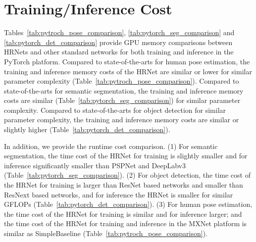 \documentclass[10pt,journal,compsoc]{IEEEtran}
\begin{document}
\clearpage
\onecolumn
\section{Training/Inference Cost}
Tables~\ref{tab:pytroch_pose_comparison}, \ref{tab:pytorch_seg_comparison} and \ref{tab:pytorch_det_comparison} provide GPU memory comparisons between HRNets and other standard networks
for both training and inference
in the PyTorch platform.
Compared to state-of-the-arts for human pose estimation,
the training and inference memory costs of the HRNet are similar or lower
for similar parameter complexity (Table~\ref{tab:pytroch_pose_comparison}).
Compared to state-of-the-arts for semantic segmentation,
the training and inference memory costs are similar 
(Table~\ref{tab:pytorch_seg_comparison})
for similar parameter complexity.
Compared to state-of-the-arts for object detection for similar parameter complexity,
the training and inference memory costs 
are similar or slightly higher
(Table~\ref{tab:pytorch_det_comparison}).

In addition,
we provide the runtime cost comparison.
(1) For semantic segmentation,
the time cost of the HRNet for training is slightly smaller
and for inference significantly smaller
than PSPNet and DeepLabv3 (Table~\ref{tab:pytorch_seg_comparison}).
(2) For object detection,
the time cost of the HRNet for training is larger than ResNet based networks and smaller than ResNext based networks, and for inference the HRNet 
is smaller for similar GFLOPs
(Table~\ref{tab:pytorch_det_comparison}).
(3) For human pose estimation,
the time cost of the HRNet for training 
is similar
and for inference
larger;
and the time cost of the HRNet for training and inference
in the MXNet platform 
is similar as SimpleBaseline (Table~\ref{tab:pytroch_pose_comparison}).
\end{document}
